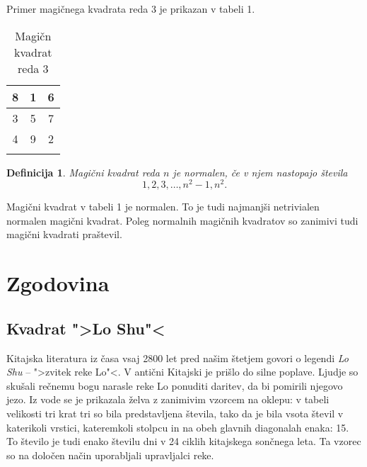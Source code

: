 \documentclass[a4paper,12pt]{article}
\newtheorem{definition}{Definicija}
\newcommand{\pojem}[1]{\emph{#1}}
\newenvironment{magic}{\begin{table}[h]
   \centering
   \caption{Magičn kvadrat reda 3}
   \label{table:mag3}
   \begin{tabular}{|*{3}{c|}}}{\\\hline \end{tabular}\end{table}}
\begin{document}
Primer magičnega kvadrata reda 3 je prikazan v tabeli 1.

\begin{magic}

      \hline
      8 & 1 & 6 \\
      \hline
      3 & 5 & 7 \\
      \hline
      4 & 9 & 2 \\
      \hline

\end{magic}
      




\begin{definition}
   Magični kvadrat reda $n$ je \pojem{normalen}, če v njem nastopajo števila
   \begin{equation}
      1, 2, 3, \ldots, n^2-1, n^2.
   \end{equation}
\end{definition}   

Magični kvadrat v tabeli 1 je normalen.
To je tudi najmanjši netrivialen normalen magični kvadrat.
Poleg normalnih magičnih kvadratov so zanimivi tudi magični kvadrati praštevil.


\section{Zgodovina}

\subsection{Kvadrat ">Lo Shu"<}

Kitajska literatura iz časa vsaj 2800 let pred našim štetjem govori o legendi
\pojem{Lo Shu} -- ">zvitek reke Lo"<. V antični Kitajski je prišlo do
silne poplave. Ljudje so skušali rečnemu bogu narasle reke Lo ponuditi daritev,
da bi pomirili njegovo jezo. Iz vode se je prikazala želva z zanimivim vzorcem
na oklepu: v tabeli velikosti tri krat tri so bila predstavljena števila, tako
da je bila vsota števil v katerikoli vrstici, kateremkoli stolpcu in na obeh
glavnih diagonalah enaka: 15. To število je tudi enako številu dni v 24 ciklih
kitajskega sončnega leta. Ta vzorec so na določen način uporabljali upravljalci
reke.
\end{document}
